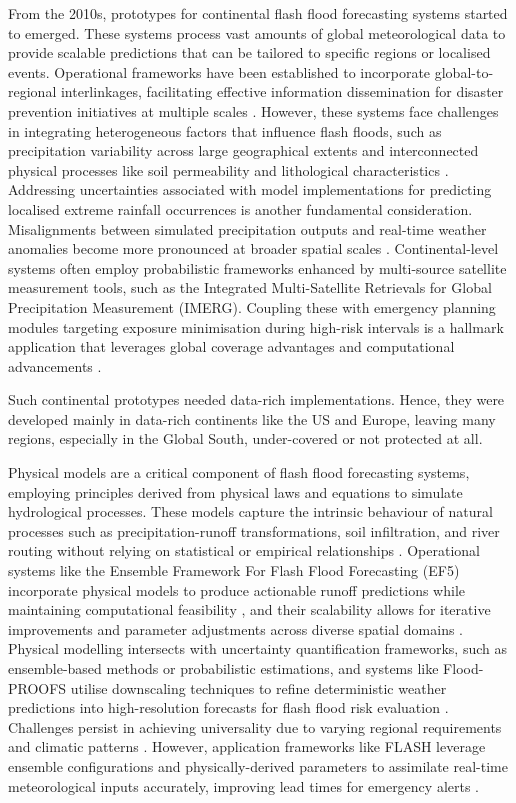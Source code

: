 From the 2010s, prototypes for continental flash flood forecasting systems started to emerged. These systems process vast amounts of global meteorological data to provide scalable predictions that can be tailored to specific regions or localised events. Operational frameworks have been established to incorporate global-to-regional interlinkages, facilitating effective information dissemination for disaster prevention initiatives at multiple scales \citep{Georgakakos_2022}. However, these systems face challenges in integrating heterogeneous factors that influence flash floods, such as precipitation variability across large geographical extents and interconnected physical processes like soil permeability and lithological characteristics \citep{HenaoSalgado_2022, Kuksina_2020}. Addressing uncertainties associated with model implementations for predicting localised extreme rainfall occurrences is another fundamental consideration. Misalignments between simulated precipitation outputs and real-time weather anomalies become more pronounced at broader spatial scales \citep{Maqtan_2022}. Continental-level systems often employ probabilistic frameworks enhanced by multi-source satellite measurement tools, such as the Integrated Multi-Satellite Retrievals for Global Precipitation Measurement (IMERG). Coupling these with emergency planning modules targeting exposure minimisation during high-risk intervals is a hallmark application that leverages global coverage advantages and computational advancements \citep{AlRawas_2024}.

Such continental prototypes needed data-rich implementations. Hence, they were developed mainly in data-rich continents like the US and Europe, leaving many regions, especially in the Global South, under-covered or not protected at all. 

Physical models are a critical component of flash flood forecasting systems, employing principles derived from physical laws and equations to simulate hydrological processes. These models capture the intrinsic behaviour of natural processes such as precipitation-runoff transformations, soil infiltration, and river routing without relying on statistical or empirical relationships \citep{Hinge_2024}. Operational systems like the Ensemble Framework For Flash Flood Forecasting (EF5) incorporate physical models to produce actionable runoff predictions while maintaining computational feasibility \citep{Flamig_2020}, and their scalability allows for iterative improvements and parameter adjustments across diverse spatial domains \citep{Xing_2019}. Physical modelling intersects with uncertainty quantification frameworks, such as ensemble-based methods or probabilistic estimations, and systems like Flood-PROOFS utilise downscaling techniques to refine deterministic weather predictions into high-resolution forecasts for flash flood risk evaluation \citep{Zanchetta_2020}. Challenges persist in achieving universality due to varying regional requirements and climatic patterns \citep{Xing_2019, AlRawas_2024}. However, application frameworks like FLASH leverage ensemble configurations and physically-derived parameters to assimilate real-time meteorological inputs accurately, improving lead times for emergency alerts \citep{Martinaitis_2023}. 

